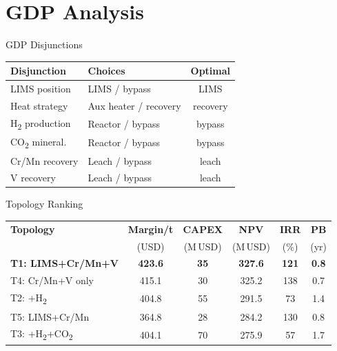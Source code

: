 \documentclass[aspectratio=169]{beamer}
\begin{document}
\section{GDP Analysis}

\begin{frame}{GDP Disjunctions}
\begin{table}
\centering
\begin{tabular}{@{}llc@{}}
\toprule
\textbf{Disjunction} & \textbf{Choices} & \textbf{Optimal} \\
\midrule
LIMS position        & LIMS / bypass       & \textcolor{StepGreen}{LIMS}  \\
Heat strategy        & Aux heater / recovery & recovery \\
H\textsubscript{2} production & Reactor / \textcolor{StepRed}{bypass} & \textcolor{StepRed}{bypass} \\
CO\textsubscript{2} mineral.  & Reactor / \textcolor{StepRed}{bypass} & \textcolor{StepRed}{bypass} \\
Cr/Mn recovery       & \textcolor{StepGreen}{Leach} / bypass & \textcolor{StepGreen}{leach} \\
V recovery           & \textcolor{StepGreen}{Leach} / bypass & \textcolor{StepGreen}{leach} \\
\bottomrule
\end{tabular}
\end{table}
\end{frame}

\begin{frame}{Topology Ranking}
\begin{table}
\centering
\small
\begin{tabular}{@{}lccccc@{}}
\toprule
\textbf{Topology} & \textbf{Margin/t} & \textbf{CAPEX} & \textbf{NPV} & \textbf{IRR} & \textbf{PB} \\
& (USD) & (M\,USD) & (M\,USD) & (\%) & (yr) \\
\midrule
\textbf{T1: LIMS+Cr/Mn+V} & \textbf{423.6} & \textbf{35} & \textbf{327.6} & \textbf{121} & \textbf{0.8} \\
T4: Cr/Mn+V only    & 415.1 & 30 & 325.2 & 138 & 0.7 \\
T2: +H\textsubscript{2}          & 404.8 & 55 & 291.5 & 73  & 1.4 \\
T5: LIMS+Cr/Mn      & 364.8 & 28 & 284.2 & 130 & 0.8 \\
T3: +H\textsubscript{2}+CO\textsubscript{2} & 404.1 & 70 & 275.9 & 57  & 1.7 \\
\bottomrule
\end{tabular}
\end{table}
\end{frame}
\end{document}
